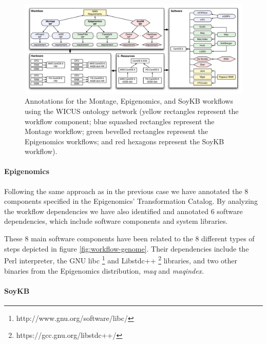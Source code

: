 \begin{figure}[!htb]
	\centering
	\includegraphics[width=\linewidth]{figures/annotations}
	\vspace{-20pt}
	\caption{Annotations for the Montage, Epigenomics, and SoyKB workflows using the WICUS ontology network (yellow rectangles represent the workflow component; blue squashed rectangles represent the Montage workflow; green bevelled rectangles represent the Epigenomics workflows; and red hexagons represent the SoyKB workflow).}
	\label{fig:annotations}

\end{figure}



\paragraph{\textbf{Epigenomics}}

Following the same approach as in the previous case we have annotated the 8 components specified in the Epigenomics' Transformation Catalog. By analyzing the workflow dependencies we have also identified and annotated 6 software dependencies, which include software components and system libraries. 

These 8 main software components have been related to the 8 different types of steps depicted in figure \ref{fig:workflow-genome}.  Their dependencies include the Perl \cite{perl} interpreter, the GNU libc \footnote{http://www.gnu.org/software/libc/} and Libstdc++ \footnote{https://gcc.gnu.org/libstdc++/} libraries, and two other binaries from the Epigenomics  distribution, \emph{maq} and \emph{maqindex}.


\paragraph{\textbf{SoyKB}}

